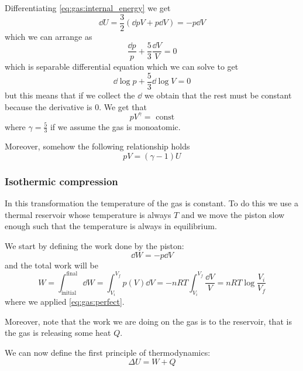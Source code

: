\documentclass[14pt]{extarticle}
\begin{document}
Differentiating \autoref{eq:gas:internal_energy} we get
\begin{equation}
    \dd{U} = \frac{3}{2} (\dd{p} V + p \dd{V}) = -p\dd{V}
\end{equation}
which we can arrange as
\begin{equation}
    \frac{\dd{p}}{p} + \frac{5}{3}\frac{\dd{V}}{{V}} = 0
\end{equation}
which is separable differential equation which we can solve to get
\begin{equation}
    \dd{\log p} + \frac{5}{3} \dd{\log V} = 0
\end{equation}
but this means that if we collect the $\dd$ we obtain that the rest must be constant because the derivative is $0$.
We get that
\begin{equation}
    p V^\gamma = \text{ const}
\end{equation}
where $\gamma = \frac{5}{3}$ if we assume the gas is monoatomic.

Moreover, somehow the following relationship holds
\begin{equation}
    pV = (\gamma - 1) U
\end{equation}

\subsubsection{Isothermic compression}

In this transformation the temperature of the gas is constant.
To do this we use a thermal reservoir whose temperature is always $T$ and we move the piston slow enough such that the temperature is always in equilibrium.

We start by defining the work done by the piston:
\begin{equation}
    \dd{W} = - p \dd{V}
\end{equation}
and the total work will be
\begin{equation}
    W = \int_\text{initial}^\text{final} \dd{W} = \int_{V_i}^{V_f} p(V) \dd{V} = -nRT \int_{V_i}^{V_f} \frac{\dd{V}}{V} = n R T \log \frac{V_i}{V_f}
\end{equation}
where we applied \autoref{eq:gas:perfect}.

Moreover, note that the work we are doing on the gas is  to the reservoir, that is the gas is releasing some heat $Q$.

We can now define the first principle of thermodynamics:
\begin{equation}
    \label{eq:gas:first_principle}
    \Delta U = W + Q
\end{equation}
\end{document}
